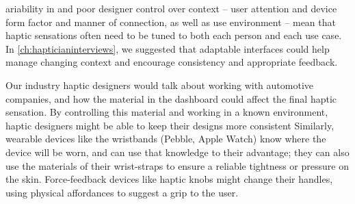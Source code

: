 %

ariability in and poor designer control over context --  user attention and  device form factor and manner of connection, as well as use environment -- mean that haptic sensations often need to be tuned to both each person and each use case.
In \autoref{ch:hapticianinterviews}, we suggested that adaptable interfaces could help manage changing context and encourage consistency and appropriate feedback.

Our industry haptic designers would talk about working with automotive companies, and how the material in the dashboard could affect the final haptic sensation.
By controlling this material and working in a known environment, haptic designers might be able to keep their designs more consistent
Similarly, wearable devices like the wristbands (Pebble, Apple Watch) know where the device will be worn, and can use that knowledge to their advantage; they can also use the materials of their wrist-straps to ensure a reliable tightness or pressure on the skin.
Force-feedback devices like haptic knobs might change their handles, using physical affordances to suggest a grip to the user.

